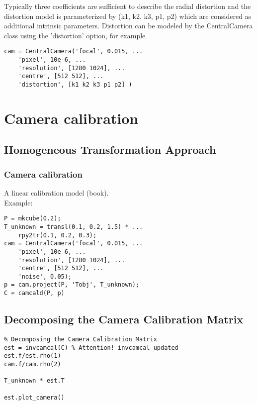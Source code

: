 \begin{frame}[fragile]
Typically three coefficients are sufficient to describe the radial distortion and the distortion model is parameterized by (k1, k2, k3, p1, p2) which are considered as additional intrinsic parameters. Distortion can be modeled by the CentralCamera class using the 'distortion' option, for example
\begin{lstlisting}
cam = CentralCamera('focal', 0.015, ...
    'pixel', 10e-6, ... 
    'resolution', [1280 1024], ...
    'centre', [512 512], ... 
    'distortion', [k1 k2 k3 p1 p2] )
\end{lstlisting}
\end{frame}

\section{Camera calibration}

\subsection{Homogeneous Transformation Approach}

\begin{frame}[fragile]
\frametitle{Camera calibration}
A linear calibration model (book).\\
Example:
\begin{lstlisting}
P = mkcube(0.2);
T_unknown = transl(0.1, 0.2, 1.5) * ...
    rpy2tr(0.1, 0.2, 0.3);
cam = CentralCamera('focal', 0.015, ...
    'pixel', 10e-6, ...
    'resolution', [1280 1024], ...
    'centre', [512 512], ... 
    'noise', 0.05);
p = cam.project(P, 'Tobj', T_unknown);
C = camcald(P, p)
\end{lstlisting}
\end{frame}

\subsection{Decomposing the Camera Calibration Matrix}

\begin{frame}[fragile]
\begin{lstlisting}
% Decomposing the Camera Calibration Matrix
est = invcamcal(C) % Attention! invcamcal_updated
est.f/est.rho(1)
cam.f/cam.rho(2)

T_unknown * est.T

est.plot_camera()
\end{lstlisting}
\end{frame}

